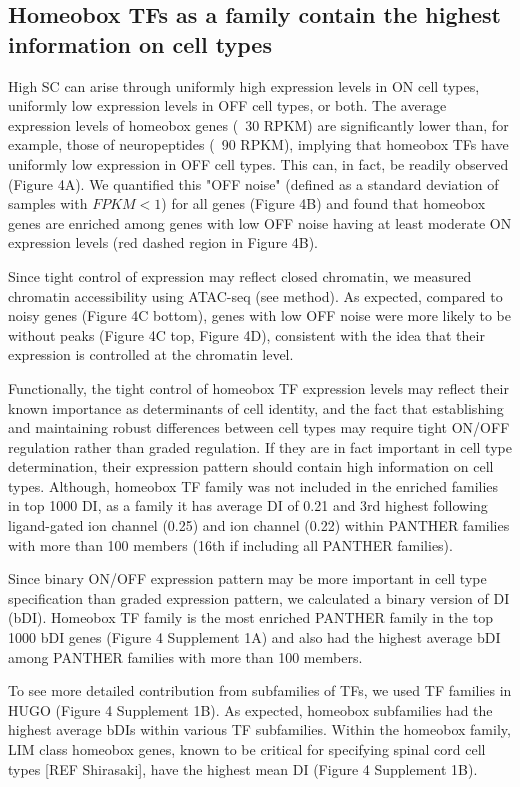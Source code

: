 \subsection{Homeobox TFs as a family contain the highest information on cell types}

High SC can arise through uniformly high expression levels in ON cell types, uniformly low expression levels in OFF cell types, or both. The average expression levels of homeobox genes (~30 RPKM) are significantly lower than, for example, those of  neuropeptides (~90 RPKM), implying that homeobox TFs have uniformly low expression in OFF cell types. This can, in fact, be readily observed (Figure 4A). We quantified this "OFF noise" (defined as a standard deviation of samples with $FPKM<1$) for all genes (Figure 4B) and found that homeobox genes are enriched among genes with low OFF noise having at least moderate ON expression levels (red dashed region in Figure 4B).

Since tight control of expression may reflect closed chromatin, we measured chromatin accessibility using ATAC-seq (see method). As expected, compared to noisy genes (Figure 4C bottom), genes with low OFF noise were more likely to be without peaks (Figure 4C top, Figure 4D), consistent with the idea that their expression is controlled at the chromatin level.

Functionally, the tight control of homeobox TF expression levels may reflect their known importance as determinants of cell identity, and the fact that establishing and maintaining robust differences between cell types may require tight ON/OFF regulation rather than graded regulation. If they are in fact important in cell type determination, their expression pattern should contain high information on cell types. Although, homeobox TF family was not included in the enriched families in top 1000 DI, as a family it has average DI of 0.21 and 3rd highest following ligand-gated ion channel (0.25) and ion channel (0.22) within PANTHER families with more than 100 members (16th if including all PANTHER families).  

Since binary ON/OFF expression pattern may be more important in cell type specification than graded expression pattern, we calculated a binary version of DI (bDI). Homeobox TF family is the most enriched PANTHER family in the top 1000 bDI genes (Figure 4 Supplement 1A) and also had the highest average bDI among PANTHER families with more than 100 members. 

To see more detailed contribution from subfamilies of TFs, we used TF families in HUGO (Figure 4 Supplement 1B). As expected, homeobox subfamilies had the highest average bDIs within various TF subfamilies. Within the homeobox family, LIM class homeobox genes, known to be critical for specifying spinal cord cell types [REF Shirasaki], have the highest mean DI (Figure 4 Supplement 1B). 

